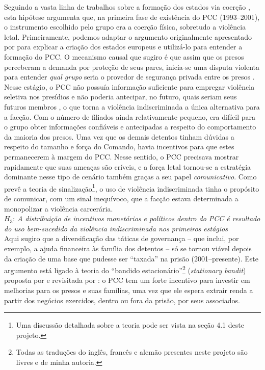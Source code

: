 \documentclass[a4paper,11pt]{article}
\begin{document}
Seguindo a vasta linha de trabalhos sobre a formação dos estados via coerção \citep{bates1981markets, herbst2000states, tilly1992coercion}, esta hipótese argumenta que, na primeira fase de existência do PCC (1993--2001), o instrumento escolhido pelo grupo era a coerção física, sobretudo a violência letal. Primeiramente, podemos adaptar o argumento originalmente apresentado por \citet{tilly1992coercion} para explicar a criação dos estados europeus e utilizá-lo para entender a formação do PCC. O mecanismo causal que sugiro é que assim que os presos perceberam a demanda por proteção de seus pares, inicia-se uma disputa violenta para entender \textit{qual grupo} seria o provedor de segurança privada entre os presos \citep{gambetta1996sicilian, skarbek2011governance}. Nesse estágio, o PCC não possuía informação suficiente para empregar violência seletiva nos presídios e não poderia antecipar, no futuro, quais seriam seus futuros membros \citep{kalyvas2006logic}, o que torna a violência indiscriminada a única alternativa para a facção. Com o número de filiados ainda relativamente pequeno, era difícil para o grupo obter informações confiáveis e antecipadas a respeito do comportamento da maioria dos presos. Uma vez que os demais detentos tinham dúvidas a respeito do tamanho e força do Comando, havia incentivos para que estes permanecerem à margem do PCC. Nesse sentido, o PCC precisava mostrar rapidamente que suas ameaças são críveis, e a força letal tornou-se a estratégia dominante nesse tipo de cenário também graças a seu papel \textit{comunicativo}. Como prevê a teoria de sinalização\footnote{Uma discussão detalhada sobre a teoria pode ser vista na seção 4.1 deste projeto.}, o uso de violência indiscriminada tinha o propósito de comunicar, com um sinal inequívoco, que a facção estava determinada a monopolizar a violência carcerária.\\

$H_3$: \textit{A distribuição de incentivos monetários e políticos dentro do PCC é resultado do uso bem-sucedido da violência indiscriminada nos primeiros estágios}\\

Aqui sugiro que a diversificação das táticas de governança -- que inclui, por exemplo, a ajuda financeira às família dos detentos \citep{camara2005} -- só se tornou viável depois da criação de uma base que pudesse ser ``taxada'' na prisão (2001--presente). Este argumento está ligado à teoria do ``bandido estacionário''\footnote{Todas as traduções do inglês, francês e alemão presentes neste projeto são livres e de minha autoria.} (\textit{stationary bandit}) proposta por \cite{olson1993dictatorship} e revisitada por \cite{skarbek2011governance}: o PCC tem um forte incentivo para investir em melhorias para os presos e suas famílias, uma vez que ele espera extrair renda a partir dos negócios exercidos, dentro ou fora da prisão, por seus associados.
\end{document}
